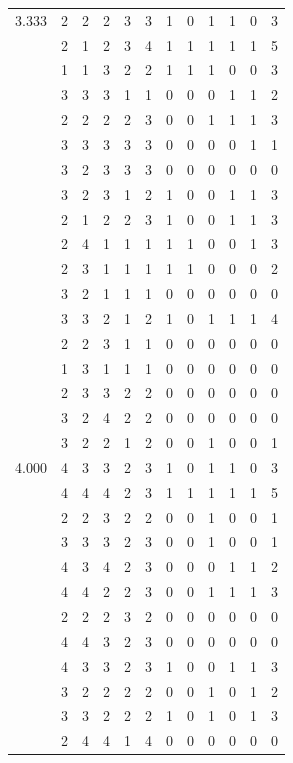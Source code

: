 \documentclass[]{book}
\theoremstyle{definition}
\theoremstyle{definition}
\theoremstyle{definition}
\theoremstyle{remark}
\begin{document}
\begin{table}
{\begin{tabular}[t]{rrrrrrrrrrrr}
3.333 & 2 & 2 & 2 & 3 & 3 & 1 & 0 & 1 & 1 & 0 & 3\\
 & 2 & 1 & 2 & 3 & 4 & 1 & 1 & 1 & 1 & 1 & 5\\
 & 1 & 1 & 3 & 2 & 2 & 1 & 1 & 1 & 0 & 0 & 3\\
 & 3 & 3 & 3 & 1 & 1 & 0 & 0 & 0 & 1 & 1 & 2\\
 & 2 & 2 & 2 & 2 & 3 & 0 & 0 & 1 & 1 & 1 & 3\\
 & 3 & 3 & 3 & 3 & 3 & 0 & 0 & 0 & 0 & 1 & 1\\
 & 3 & 2 & 3 & 3 & 3 & 0 & 0 & 0 & 0 & 0 & 0\\
 & 3 & 2 & 3 & 1 & 2 & 1 & 0 & 0 & 1 & 1 & 3\\
 & 2 & 1 & 2 & 2 & 3 & 1 & 0 & 0 & 1 & 1 & 3\\
 & 2 & 4 & 1 & 1 & 1 & 1 & 1 & 0 & 0 & 1 & 3\\
 & 2 & 3 & 1 & 1 & 1 & 1 & 1 & 0 & 0 & 0 & 2\\
 & 3 & 2 & 1 & 1 & 1 & 0 & 0 & 0 & 0 & 0 & 0\\
 & 3 & 3 & 2 & 1 & 2 & 1 & 0 & 1 & 1 & 1 & 4\\
 & 2 & 2 & 3 & 1 & 1 & 0 & 0 & 0 & 0 & 0 & 0\\
 & 1 & 3 & 1 & 1 & 1 & 0 & 0 & 0 & 0 & 0 & 0\\
 & 2 & 3 & 3 & 2 & 2 & 0 & 0 & 0 & 0 & 0 & 0\\
 & 3 & 2 & 4 & 2 & 2 & 0 & 0 & 0 & 0 & 0 & 0\\
 & 3 & 2 & 2 & 1 & 2 & 0 & 0 & 1 & 0 & 0 & 1\\
4.000 & 4 & 3 & 3 & 2 & 3 & 1 & 0 & 1 & 1 & 0 & 3\\
 & 4 & 4 & 4 & 2 & 3 & 1 & 1 & 1 & 1 & 1 & 5\\
 & 2 & 2 & 3 & 2 & 2 & 0 & 0 & 1 & 0 & 0 & 1\\
 & 3 & 3 & 3 & 2 & 3 & 0 & 0 & 1 & 0 & 0 & 1\\
 & 4 & 3 & 4 & 2 & 3 & 0 & 0 & 0 & 1 & 1 & 2\\
 & 4 & 4 & 2 & 2 & 3 & 0 & 0 & 1 & 1 & 1 & 3\\
 & 2 & 2 & 2 & 3 & 2 & 0 & 0 & 0 & 0 & 0 & 0\\
 & 4 & 4 & 3 & 2 & 3 & 0 & 0 & 0 & 0 & 0 & 0\\
 & 4 & 3 & 3 & 2 & 3 & 1 & 0 & 0 & 1 & 1 & 3\\
 & 3 & 2 & 2 & 2 & 2 & 0 & 0 & 1 & 0 & 1 & 2\\
 & 3 & 3 & 2 & 2 & 2 & 1 & 0 & 1 & 0 & 1 & 3\\
 & 2 & 4 & 4 & 1 & 4 & 0 & 0 & 0 & 0 & 0 & 0\\

\end{tabular}}
\end{table}
\end{document}
